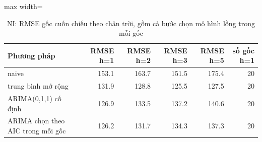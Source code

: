 \begin{table}[H]
\centering\small
\caption{NI: RMSE gốc cuốn chiếu theo chân trời, gồm cả bước chọn mô hình lồng trong mỗi gốc}\label{tab:tab_b12_12_ni_rolling}
\begin{adjustbox}{max width=\linewidth}
\begin{tabular}{>{\raggedright\arraybackslash}p{}rrrrr}
\toprule
Phương pháp & RMSE h=1 & RMSE h=2 & RMSE h=3 & RMSE h=5 & số gốc h=1 \\
\midrule
naive & 153.1 & 163.7 & 151.5 & 175.4 & 20 \\
trung bình mở rộng & 131.9 & 128.8 & 125.5 & 127.5 & 20 \\
ARIMA(0,1,1) cố định & 126.9 & 133.5 & 137.2 & 140.6 & 20 \\
ARIMA chọn theo AIC trong mỗi gốc & 126.2 & 131.7 & 134.3 & 137.3 & 20 \\
\bottomrule
\end{tabular}
\end{adjustbox}
\end{table}
